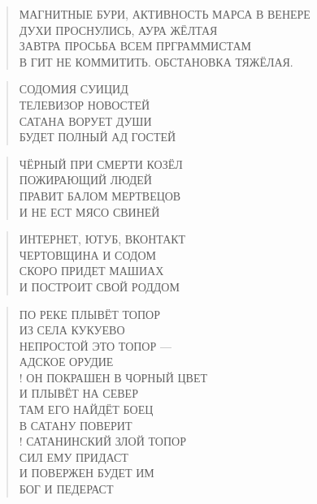 \poemtitle{***}
\begin{verse}
МАГНИТНЫЕ БУРИ, АКТИВНОСТЬ МАРСА В ВЕНЕРЕ\\
ДУХИ ПРОСНУЛИСЬ, АУРА ЖЁЛТАЯ\\
ЗАВТРА ПРОСЬБА ВСЕМ ПРГРАММИСТАМ\\
В ГИТ НЕ КОММИТИТЬ. ОБСТАНОВКА ТЯЖЁЛАЯ.
\end{verse}

\poemtitle{***}
\begin{verse}
СОДОМИЯ СУИЦИД\\
ТЕЛЕВИЗОР НОВОСТЕЙ\\
САТАНА ВОРУЕТ ДУШИ\\
БУДЕТ ПОЛНЫЙ АД ГОСТЕЙ
\end{verse}

\poemtitle{***}
\begin{verse}
ЧЁРНЫЙ ПРИ СМЕРТИ КОЗЁЛ\\
ПОЖИРАЮЩИЙ ЛЮДЕЙ\\
ПРАВИТ БАЛОМ МЕРТВЕЦОВ\\
И НЕ ЕСТ МЯСО СВИНЕЙ
\end{verse}

\poemtitle{***}
\begin{verse}
ИНТЕРНЕТ, ЮТУБ, ВКОНТАКТ\\
ЧЕРТОВЩИНА И СОДОМ\\
СКОРО ПРИДЕТ МАШИАХ\\
И ПОСТРОИТ СВОЙ РОДДОМ
\end{verse}

\poemtitle{***}
\begin{verse}
ПО РЕКЕ ПЛЫВЁТ ТОПОР\\
ИЗ СЕЛА КУКУЕВО\\
НЕПРОСТОЙ ЭТО ТОПОР —\\
АДСКОЕ ОРУДИЕ\\!
ОН ПОКРАШЕН В ЧОРНЫЙ ЦВЕТ\\
И ПЛЫВЁТ НА СЕВЕР\\
ТАМ ЕГО НАЙДЁТ БОЕЦ\\
В САТАНУ ПОВЕРИТ\\!
САТАНИНСКИЙ ЗЛОЙ ТОПОР\\
СИЛ ЕМУ ПРИДАСТ\\
И ПОВЕРЖЕН БУДЕТ ИМ\\
БОГ И ПЕДЕРАСТ
\end{verse}

